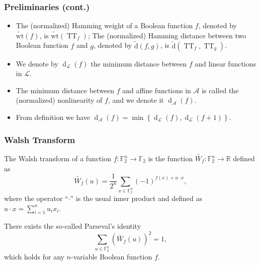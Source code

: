\documentclass[
    aspectratio=169,                   %
]{beamer}
\newcommand{\F}{\mathbb{F}}
\newcommand{\R}{\mathbb{R}}
\newcommand{\dis}{\operatorname{\widetilde{d}}}
\newcommand{\wt}{\operatorname{\widetilde{wt}}}
\newcommand{\nnl}{\operatorname{d}_{\mathcal{A}}}
\newcommand{\disl}{\operatorname{d}_{\mathcal{L}}}
\begin{document}
    \begin{frame}
        \frametitle{Preliminaries (cont.)}
        \begin{itemize}
            \item The (normalized) Hamming weight of a Boolean function $f$, denoted by $\wt(f)$, is $\wt(\operatorname{TT}_f)$; The (normalized) Hamming distance between two Boolean function $f$ and $g$, denoted by $\dis(f,g)$, is $\dis(\operatorname{TT}_f,\operatorname{TT}_g)$. 
            \item We denote by $\disl(f)$ the minimum distance between $f$ and linear functions in $\mathcal{L}$.
            \item  The minimum distance between $f$ and affine functions in $\mathcal{A}$ is called the (normalized) nonlinearity of $f$, and we denote it $\nnl(f)$.
            \item From definition we have $\nnl(f)=\min\left\{ \disl(f),\disl(f+1) \right\}$.
        \end{itemize}
    \end{frame}

    \begin{frame}
        \frametitle{Walsh Transform}
        
        \begin{definition}
            The Walsh transform of a function $f:\F_2^n\rightarrow\F_2$ is the function $\widetilde{W_f}:\F_2^n\rightarrow\R$ defined as 
            \[\widetilde{W_f}(u)=\frac{1}{2^n}\sum_{x\in\F_2^n}(-1)^{f(x)+u\cdot x},\]
            where the operator ``$\cdot$'' is the usual inner product and defined as $u\cdot x=\sum_{i=1}^{n}u_ix_i$. 
        \end{definition}
        There exists the so-called Parseval's identity 
        \[\sum_{u\in\F_2^n}\left( \widetilde{W_f}(u) \right)^2=1,\]
        which holds for any $n$-variable Boolean function $f$.
    
    \end{frame}
\end{document}
